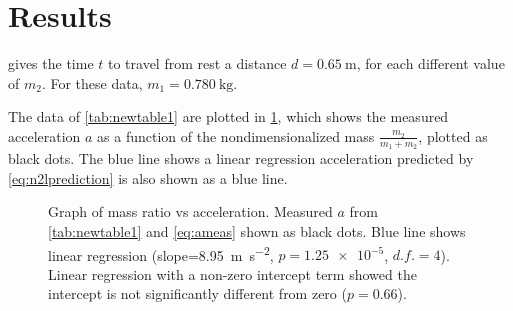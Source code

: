 ﻿\documentclass[reprint,amsmath,amssymb,aps,twoside]{revtex4-2}
\begin{document}
%
%
%
%
%
%
%




\section{Results}
 gives the time $t$ to travel from rest a distance $d=\qty{0.65}{\meter}$, for each different value of $m_2$. For these data, $m_1=\qty{0.780}{\kilo\gram}$. 


The data of \cref{tab:newtable1} are plotted in \cref{fig:graph}, which shows the measured acceleration $a$ as a function of the nondimensionalized mass $\frac{m_2}{m_1+m_2}$, plotted as black dots. The blue line shows a linear regression acceleration predicted by \cref{eq:n2lprediction} is also shown as a blue line. 
\begin{figure}
\begin{center}

\end{center}
\caption{\label{fig:graph} Graph of mass ratio vs acceleration. Measured $a$ from \cref{tab:newtable1} and \cref{eq:ameas} shown as black dots.  Blue line shows linear regression (slope=\qty{8.95}{\meter\per\second\squared}, $p=\num{1.25e-5}$, $d.f.=4$). Linear regression with a non-zero intercept term showed the intercept is not significantly different from zero ($p=0.66$).}  
\end{figure}
\end{document}
